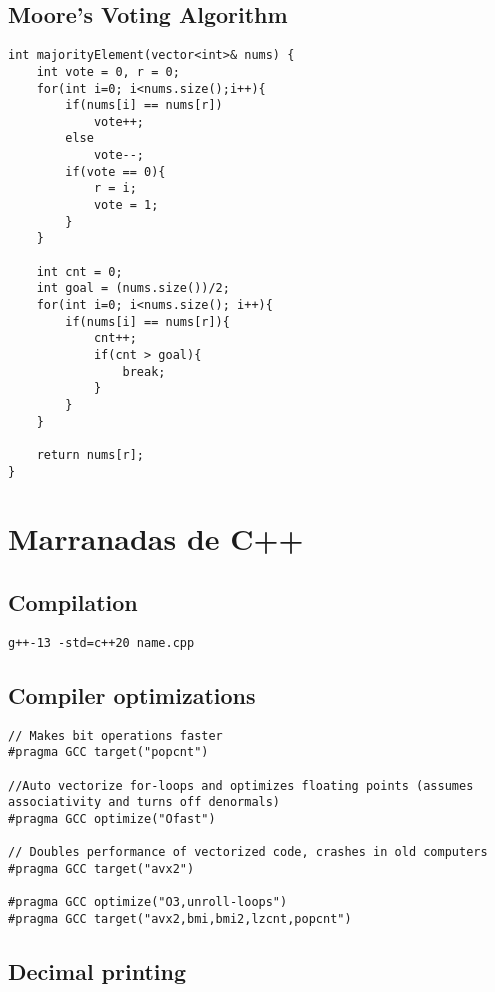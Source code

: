 \documentclass[10pt]{article}
\begin{document}
\begin{multicols*}{2}
\subsection{Moore's Voting Algorithm}

\begin{lstlisting}[style=compactcpp]
int majorityElement(vector<int>& nums) {
    int vote = 0, r = 0;
    for(int i=0; i<nums.size();i++){
        if(nums[i] == nums[r])
            vote++;
        else
            vote--;
        if(vote == 0){
            r = i;
            vote = 1;
        } 
    }

    int cnt = 0;
    int goal = (nums.size())/2;
    for(int i=0; i<nums.size(); i++){
        if(nums[i] == nums[r]){
            cnt++;
            if(cnt > goal){
                break;
            }
        }
    }

    return nums[r];
}
\end{lstlisting}

\section{Marranadas de C++}

\subsection{Compilation}

\texttt{g++-13 -std=c++20 name.cpp}

\subsection{Compiler optimizations}


\begin{lstlisting}[style=compactcpp]
// Makes bit operations faster
#pragma GCC target("popcnt") 

//Auto vectorize for-loops and optimizes floating points (assumes associativity and turns off denormals)
#pragma GCC optimize("Ofast")

// Doubles performance of vectorized code, crashes in old computers
#pragma GCC target("avx2")

#pragma GCC optimize("O3,unroll-loops")
#pragma GCC target("avx2,bmi,bmi2,lzcnt,popcnt")
\end{lstlisting}

\subsection{Decimal printing}


\end{multicols*}
\end{document}
